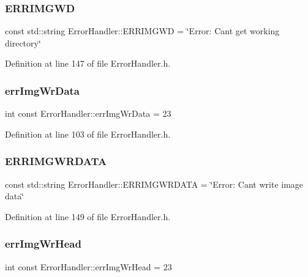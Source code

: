 \subsubsection{\texorpdfstring{ERRIMGWD}{ERRIMGWD}}
{\footnotesize\ttfamily const std\+::string Error\+Handler\+::\+E\+R\+R\+I\+M\+G\+WD = \char`\"{}Error\+: Can\textquotesingle{}t get working directory\char`\"{}\hspace{0.3cm}{\ttfamily [static]}}



Definition at line 147 of file Error\+Handler.\+h.

\mbox{\label{classErrorHandler_a5f37588aedcbd44ec5b33f16dd35a01e}} 
\subsubsection{\texorpdfstring{errImgWrData}{errImgWrData}}
{\footnotesize\ttfamily int const Error\+Handler\+::err\+Img\+Wr\+Data = 23\hspace{0.3cm}{\ttfamily [static]}}



Definition at line 103 of file Error\+Handler.\+h.

\mbox{\label{classErrorHandler_afc2c1377f8cee14dac495c98323b02f1}} 
\subsubsection{\texorpdfstring{ERRIMGWRDATA}{ERRIMGWRDATA}}
{\footnotesize\ttfamily const std\+::string Error\+Handler\+::\+E\+R\+R\+I\+M\+G\+W\+R\+D\+A\+TA = \char`\"{}Error\+: Can\textquotesingle{}t write image data\char`\"{}\hspace{0.3cm}{\ttfamily [static]}}



Definition at line 149 of file Error\+Handler.\+h.

\mbox{\label{classErrorHandler_a76194049ce9812eacb553724e5c1d78c}} 
\subsubsection{\texorpdfstring{errImgWrHead}{errImgWrHead}}
{\footnotesize\ttfamily int const Error\+Handler\+::err\+Img\+Wr\+Head = 23\hspace{0.3cm}{\ttfamily [static]}}



